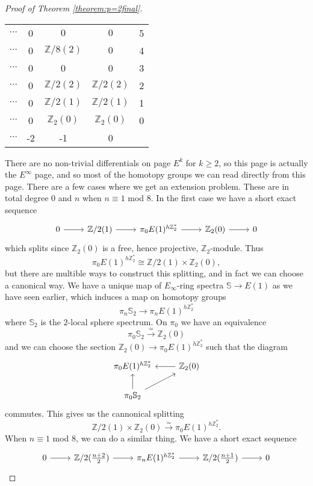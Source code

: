 \documentclass[a4paper]{article} %
\theoremstyle{definition}
\newcommand{\toWithMapLong}[1]{\overset{#1}{\longrightarrow}}
\newcommand{\Z}{\mathbb{Z}}
\newcommand{\Sph}{\mathbb{S}}
\begin{document}
\begin{proof}[Proof of Theorem \ref{theorem:p=2final}]
\begin{table}[H]
\begin{tabular}{cccc|c}
    $\cdots$        &   0 &  $0$  & $0$  & 5 \\
      $\cdots$        &   0 &  $\Z/8 (2)$  & $0$  & 4 \\
      $\cdots$        &   0 &  0  &  0 & 3 \\
      $\cdots$        &  0  &  $\Z/2(2)$  &  $\Z/2(2)$ & 2 \\
      $\cdots$       &  0  &  $\Z/2(1)$  & $\Z/2(1)$  & 1 \\
      $\cdots$       &  0  & $\Z_2(0)$ &  $\Z_2(0)$  & 0 \\ \hline
  $\cdots$  & -2 & -1 & 0 &
  \end{tabular}
  \end{table}
  \noindent There are no non-trivial differentials on page $E^k$ for $k \ge 2$, so this page is actually the $E^\infty$ page, and so most of the homotopy groups we can read directly from this page. There are a few cases where we get an extension problem. These are in total degree $0$ and $n$ when $n \equiv 1$ mod $8$. In the first case we have a short exact sequence
  \[
  \begin{tikzcd}
    0 \rar & \Z/2(1) \rar & \pi_0E(1)^{h\Z_2^*} \rar & \Z_2(0) \rar & 0
  \end{tikzcd}
  \]
  which splits since $\Z_2(0)$ is a free, hence projective, $\Z_2$-module. Thus
  \[
  \pi_0E(1)^{h\Z_2^*} \cong \Z/2(1) \times \Z_2(0),
  \]
  but there are multible ways to construct this splitting, and in fact we can choose a canonical way. We have a unique map of $E_\infty$-ring spectra $\Sph \to E(1)$ as we have seen earlier, which induces a map on homotopy groups
  \[
  \pi_n \Sph_2 \to \pi_nE(1)^{h\Z_2^*}
  \]
  where $\Sph_2$ is the $2$-local sphere spectrum. On $\pi_0$ we have an equivalence
  \[
  \pi_0\Sph_2 \toWithMapLong{\simeq} \Z_2(0)
  \]
  and we can choose the section $\Z_2(0) \to \pi_0 E(1)^{h\Z_2^*}$ such that the diagram
  \[
  \begin{tikzcd}
    \pi_0E(1)^{h\Z_2^*} & \Z_2(0) \lar \\
    \pi_0 \Sph_2 \arrow{u} \arrow{ur} &
  \end{tikzcd}
  \]
  commutes. This gives us the cannonical splitting
  \[
  \Z/2(1) \times \Z_2(0) \toWithMapLong{\simeq} \pi_0E(1)^{h\Z_2^*}.
  \]
  When $n \equiv 1$ mod $8$, we can do a similar thing. We have a short exact sequence
  \[
  \begin{tikzcd}
    0 \rar & \Z/2(\frac{n+2}{2}) \rar & \pi_nE(1)^{h\Z_2^*} \rar & \Z/2(\frac{n+1}{2}) \rar & 0
  \end{tikzcd}
\]
\end{proof}
\end{document}

